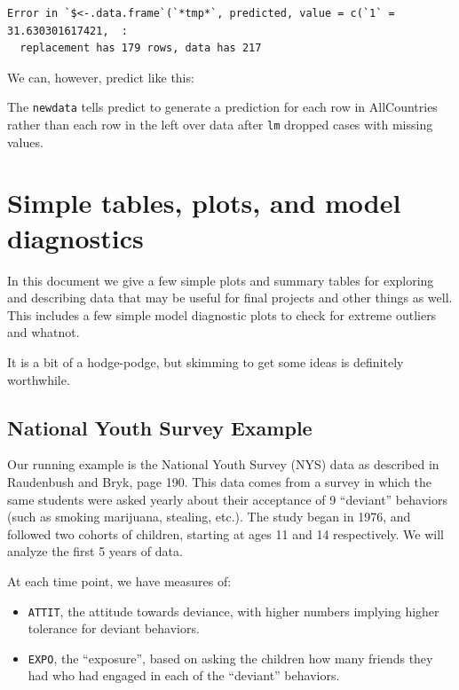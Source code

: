 \documentclass[
  letterpaper,
  DIV=11,
  numbers=noendperiod]{scrreprt}
\newenvironment{Shaded}{}{}
\newcommand{\AttributeTok}[1]{\textcolor[rgb]{0.49,0.56,0.16}{#1}}
\newcommand{\FunctionTok}[1]{\textcolor[rgb]{0.02,0.16,0.49}{#1}}
\newcommand{\NormalTok}[1]{#1}
\newcommand{\OtherTok}[1]{\textcolor[rgb]{0.00,0.44,0.13}{#1}}
\newcommand{\SpecialCharTok}[1]{\textcolor[rgb]{0.25,0.44,0.63}{#1}}
\providecommand{\tightlist}{%
  \setlength{\itemsep}{0pt}\setlength{\parskip}{0pt}}\usepackage{longtable,booktabs,array}
\begin{document}
\begin{verbatim}
Error in `$<-.data.frame`(`*tmp*`, predicted, value = c(`1` = 31.630301617421,  : 
  replacement has 179 rows, data has 217
\end{verbatim}

We can, however, predict like this:

\begin{Shaded}
\end{Shaded}

The \texttt{newdata} tells predict to generate a prediction for each row
in AllCountries rather than each row in the left over data after
\texttt{lm} dropped cases with missing values.

\chapter{Simple tables, plots, and model
diagnostics}\label{simple-tables-plots-and-model-diagnostics}

In this document we give a few simple plots and summary tables for
exploring and describing data that may be useful for final projects and
other things as well. This includes a few simple model diagnostic plots
to check for extreme outliers and whatnot.

It is a bit of a hodge-podge, but skimming to get some ideas is
definitely worthwhile.

\section{National Youth Survey
Example}\label{national-youth-survey-example}

Our running example is the National Youth Survey (NYS) data as described
in Raudenbush and Bryk, page 190. This data comes from a survey in which
the same students were asked yearly about their acceptance of 9
``deviant'' behaviors (such as smoking marijuana, stealing, etc.). The
study began in 1976, and followed two cohorts of children, starting at
ages 11 and 14 respectively. We will analyze the first 5 years of data.

At each time point, we have measures of:

\begin{itemize}
\tightlist
\item
  \texttt{ATTIT}, the attitude towards deviance, with higher numbers
  implying higher tolerance for deviant behaviors.
\item
  \texttt{EXPO}, the ``exposure'', based on asking the children how many
  friends they had who had engaged in each of the ``deviant'' behaviors.
\end{itemize}
\end{document}
